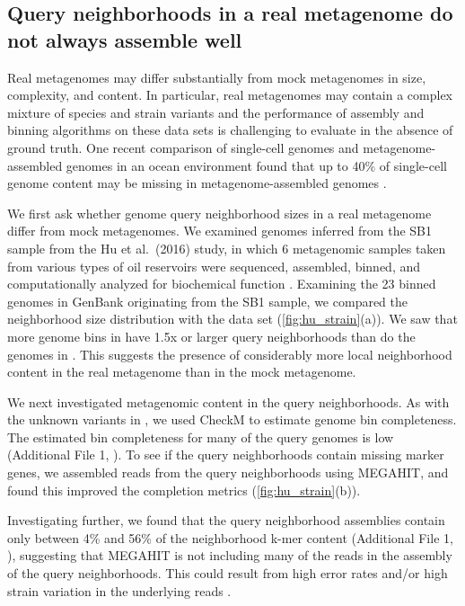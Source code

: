 \subsection*{Query neighborhoods in a real metagenome do not always assemble well}

Real metagenomes may differ substantially from mock metagenomes in
size, complexity, and content.  In particular, real metagenomes may
contain a complex mixture of species and strain variants \cite{Sharon2015}
and the performance of assembly and binning algorithms on these data sets
is challenging to evaluate in the absence of ground truth.
One recent comparison of single-cell genomes and metagenome-assembled
genomes in an ocean environment found that up to 40\% of single-cell
genome content may be missing in metagenome-assembled genomes \cite{baltic}.

We first ask whether genome query neighborhood sizes in a real
metagenome differ from mock metagenomes.  We examined genomes inferred
from the SB1 sample from the Hu et al.\ (2016) study, in which 6
metagenomic samples taken from various types of oil reservoirs were
sequenced, assembled, binned, and computationally analyzed for
biochemical function \cite{Hu2016}.  Examining the 23 binned genomes
in GenBank originating from the SB1 sample, we compared the \hu
neighborhood size distribution with the \podarv data set
(\autoref{fig:hu_strain}(a)). We saw that more genome bins in \hu
have 1.5x or larger query neighborhoods than do the genomes in
\podarv. This suggests the presence of considerably more local
neighborhood content in the real metagenome than in the mock
metagenome.

We next investigated metagenomic content in the query
neighborhoods.  As with the unknown variants in \podarv, we used
CheckM to estimate genome bin completeness.  The estimated bin
completeness for many of the query genomes is low
(Additional File 1, ).
To see if the query neighborhoods contain missing marker genes, we
assembled reads from the query neighborhoods using MEGAHIT, and found
this improved the completion metrics (\autoref{fig:hu_strain}(b)).

Investigating further, we found that the query neighborhood assemblies
contain only between 4\% and 56\% of the neighborhood k-mer
content (Additional File 1, ), suggesting that MEGAHIT is
not including many of the reads in the assembly of the query neighborhoods.
This could result from high
error rates and/or high strain variation in the underlying reads
\cite{CAMI,Awad155358}.

